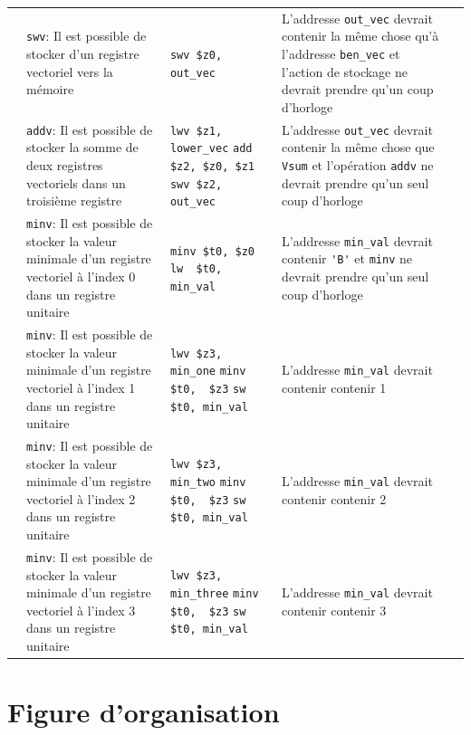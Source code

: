 \documentclass[a11paper]{article}
\newcommand{\cbox}{\fbox{\phantom{\ding{51}}}}
\newcounter{tid}
\newcommand{\tid}{\stepcounter{tid}\thetid}
\begin{document}
\begin{center}
\begin{longtable}{lp{5cm}p{3.5cm}p{4.5cm}l}
		\tid & \verb|swv|:
		Il est possible de stocker d'un registre vectoriel vers la mémoire &
		\verb|swv $z0, out_vec|                &
    L'addresse \verb|out_vec| devrait contenir la même chose qu'à
    l'addresse \verb|ben_vec| et l'action de stockage ne devrait prendre qu'un
    coup d'horloge &
		\cbox
		\\

		\tid & \verb|addv|:
		Il est possible de stocker la somme de deux registres vectoriels dans un troisième
    registre &
		\verb|lwv $z1, lower_vec|
		\verb|add $z2, $z0, $z1|
		\verb|swv $z2, out_vec|
    &
    L'addresse \verb|out_vec| devrait contenir la même chose que \verb|Vsum|
    et l'opération \verb|addv| ne devrait prendre qu'un seul coup d'horloge &
		\cbox
		\\

		\tid & \verb|minv|:
		Il est possible de stocker la valeur minimale d'un registre vectoriel à l'index 0 dans
    un registre unitaire &
		\verb|minv $t0, $z0|
		\verb|lw  $t0, min_val|
    &
    L'addresse \verb|min_val| devrait contenir \verb|'B'|
    et \verb|minv| ne devrait prendre qu'un seul coup d'horloge &
		\cbox
		\\

		\tid & \verb|minv|:
		Il est possible de stocker la valeur minimale d'un registre vectoriel à l'index 1 dans
    un registre unitaire &
		\verb|lwv $z3, min_one|
		\verb|minv $t0,  $z3|
		\verb|sw  $t0, min_val|
    &
    L'addresse \verb|min_val| devrait contenir  contenir 1
    &
		\cbox
		\\

		\tid & \verb|minv|:
		Il est possible de stocker la valeur minimale d'un registre vectoriel à l'index 2 dans
    un registre unitaire &
		\verb|lwv $z3, min_two|
		\verb|minv $t0,  $z3|
		\verb|sw  $t0, min_val|
    &
    L'addresse \verb|min_val| devrait contenir  contenir 2
    &
		\cbox
		\\

		\tid & \verb|minv|:
		Il est possible de stocker la valeur minimale d'un registre vectoriel à l'index 3 dans
    un registre unitaire &
		\verb|lwv $z3, min_three|
		\verb|minv $t0,  $z3|
		\verb|sw  $t0, min_val|
    &
    L'addresse \verb|min_val| devrait contenir  contenir 3
    &
		\cbox
		\\

	\end{longtable}
\end{center}

\section{Figure d'organisation}
\end{document}
